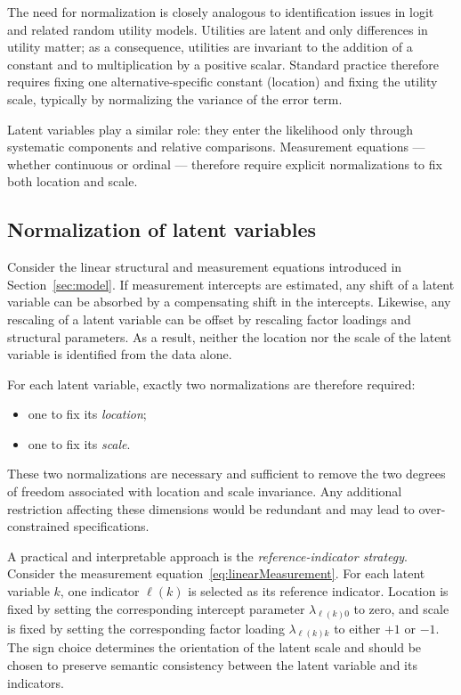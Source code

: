 \documentclass[12pt,a4paper]{article}
\begin{document}
The need for normalization is closely analogous to identification
issues in logit and related random utility models. Utilities are
latent and only differences in utility matter; as a consequence,
utilities are invariant to the addition of a constant and to
multiplication by a positive scalar. Standard practice therefore
requires fixing one alternative-specific constant (location) and
fixing the utility scale, typically by normalizing the variance of the
error term.

Latent variables play a similar role: they enter the likelihood only
through systematic components and relative comparisons. Measurement
equations --- whether continuous or ordinal --- therefore require
explicit normalizations to fix both location and scale.

\subsection{Normalization of latent variables}

Consider the linear structural and measurement equations introduced in
Section~\ref{sec:model}. If measurement intercepts are estimated, any
shift of a latent variable can be absorbed by a compensating shift in
the intercepts. Likewise, any rescaling of a latent variable can be
offset by rescaling factor loadings and structural parameters. As a
result, neither the location nor the scale of the latent variable is
identified from the data alone.

For each latent variable, exactly two normalizations are therefore
required:
\begin{itemize}
  \item one to fix its \emph{location};
  \item one to fix its \emph{scale}.
\end{itemize}
These two normalizations are necessary and sufficient to remove the
two degrees of freedom associated with location and scale
invariance. Any additional restriction affecting these dimensions
would be redundant and may lead to over-constrained specifications.

A practical and interpretable approach is the
\emph{reference-indicator strategy}. Consider the measurement
equation~\eqref{eq:linearMeasurement}. For each latent variable $k$,
one indicator $\ell(k)$ is selected as its reference indicator.
Location is fixed by setting the corresponding intercept parameter
$\lambda_{\ell(k)0}$ to zero, and scale is fixed by setting the
corresponding factor loading $\lambda_{\ell(k)k}$ to either $+1$ or
$-1$. The sign choice determines the orientation of the latent scale
and should be chosen to preserve semantic consistency between the
latent variable and its indicators.
\end{document}
